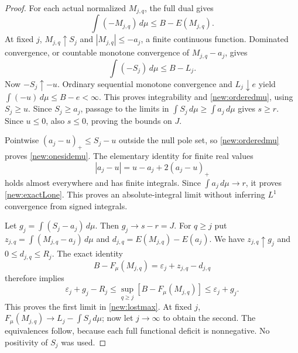 \documentclass[11pt]{article}
\begin{document}
\begin{proof}
For each actual normalized $M_{j,q}$, the full dual gives
\[
 \int(-M_{j,q})\,d\mu\le B-E(M_{j,q}).
\]
At fixed $j$, $M_{j,q}\uparrow S_j$ and $|M_{j,q}|\le-a_j$,
a finite continuous function. Dominated convergence, or countable
monotone convergence of $M_{j,q}-a_j$, gives
\[
 \int(-S_j)\,d\mu\le B-L_j.
\]
Now $-S_j\uparrow-u$. Ordinary sequential monotone convergence and
$L_j\downarrow e$ yield $\int(-u)\,d\mu\le B-e<\infty$.
This proves integrability and \eqref{new:orderedmu}, using
$S_j\ge u$. Since $S_j\ge a_j$, passage to the limits in
$\int S_j\,d\mu\ge\int a_j\,d\mu$ gives $s\ge r$.
Since $u\le0$, also $s\le0$, proving the bounds on $J$.

Pointwise $(a_j-u)_+\le S_j-u$ outside the null pole set, so
\eqref{new:orderedmu} proves \eqref{new:onesidemu}. The elementary
identity for finite real values
\[
 |a_j-u|=u-a_j+2(a_j-u)_+
\]
holds almost everywhere and has finite integrals. Since
$\int a_j\,d\mu\to r$, it proves \eqref{new:exactLone}.
This proves an absolute-integral limit without inferring $L^1$
convergence from signed integrals.

Let $g_j=\int(S_j-a_j)\,d\mu$. Then $g_j\to s-r=J$.
For $q\ge j$ put $z_{j,q}=\int(M_{j,q}-a_j)\,d\mu$ and
$d_{j,q}=E(M_{j,q})-E(a_j)$. We have $z_{j,q}\uparrow g_j$ and
$0\le d_{j,q}\le R_j$. The exact identity
\[
 B-F_\mu(M_{j,q})=\varepsilon_j+z_{j,q}-d_{j,q}
\]
therefore implies
\[
 \varepsilon_j+g_j-R_j
 \le\sup_{q\ge j}[B-F_\mu(M_{j,q})]
 \le\varepsilon_j+g_j.
\]
This proves the first limit in \eqref{new:lostmax}. At fixed $j$,
$F_\mu(M_{j,q})\to L_j-\int S_j\,d\mu$; now let $j\to\infty$
to obtain the second. The equivalences follow, because each full
functional deficit is nonnegative. No positivity of $S_j$ was used.
\end{proof}
\end{document}
